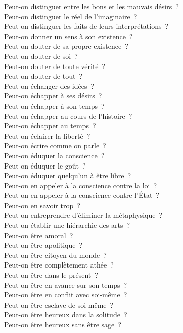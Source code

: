 \documentclass[a4paper,12pt]{article}
\begin{document}
Peut-on distinguer entre les bons et les mauvais désirs ? \\
Peut-on distinguer le réel de l'imaginaire ? \\
Peut-on distinguer les faits de leurs interprétations ? \\
Peut-on donner un sens à son existence ? \\
Peut-on douter de sa propre existence ? \\
Peut-on douter de soi ? \\
Peut-on douter de toute vérité ? \\
Peut-on douter de tout ? \\
Peut-on échanger des idées ? \\
Peut-on échapper à ses désirs ? \\
Peut-on échapper à son temps ? \\
Peut-on échapper au cours de l'histoire ? \\
Peut-on échapper au temps ? \\
Peut-on éclairer la liberté ? \\
Peut-on écrire comme on parle ? \\
Peut-on éduquer la conscience ? \\
Peut-on éduquer le goût ? \\
Peut-on éduquer quelqu'un à être libre ? \\
Peut-on en appeler à la conscience contre la loi ? \\
Peut-on en appeler à la conscience contre l'État ? \\
Peut-on en savoir trop ? \\
Peut-on entreprendre d'éliminer la métaphysique ? \\
Peut-on établir une hiérarchie des arts ? \\
Peut-on être amoral ? \\
Peut-on être apolitique ? \\
Peut-on être citoyen du monde ? \\
Peut-on être complètement athée ? \\
Peut-on être dans le présent ? \\
Peut-on être en avance sur son temps ? \\
Peut-on être en conflit avec soi-même ? \\
Peut-on être esclave de soi-même ? \\
Peut-on être heureux dans la solitude ? \\
Peut-on être heureux sans être sage ? \\
\end{document}
